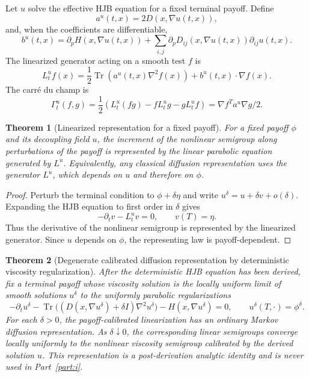 \documentclass[12pt, letterpaper]{amsart}
\providecommand{\Tr}{\operatorname{Tr}}
\theoremstyle{plain}
\newtheorem{theorem}{Theorem}[section]
\theoremstyle{definition}
\theoremstyle{remark}
\begin{document}
Let $u$ solve the effective HJB equation for a fixed terminal payoff.  Define
\begin{equation}
    a^u(t,x)=2D(x,\nabla u(t,x)),
\end{equation}
and, when the coefficients are differentiable,
\begin{equation}
    b^u(t,x)=\partial_pH(x,\nabla u(t,x))
    +\sum_{i,j}\partial_{p}D_{ij}(x,\nabla u(t,x))\partial_{ij}u(t,x).
\end{equation}
The linearized generator acting on a smooth test $f$ is
\begin{equation}
    L^u_tf(x)=\frac12\Tr(a^u(t,x)\nabla^2f(x))+b^u(t,x)\cdot\nabla f(x).
\end{equation}
The carr\'e du champ is
\begin{equation}
    \Gamma^u_t(f,g)=\frac12\left(L^u_t(fg)-fL^u_tg-gL^u_tf\right)
    =\nabla f^Ta^u\nabla g/2 .
\end{equation}

\begin{theorem}[Linearized representation for a fixed payoff]
\label{thm:linearized_representation}
For a fixed payoff $\phi$ and its decoupling field $u$, the increment of the nonlinear semigroup along perturbations of the payoff is represented by the linear parabolic equation generated by $L^u$.  Equivalently, any classical diffusion representation uses the generator $L^u$, which depends on $u$ and therefore on $\phi$.
\end{theorem}

\begin{proof}
Perturb the terminal condition to $\phi+\delta\eta$ and write $u^\delta=u+\delta v+o(\delta)$.  Expanding the HJB equation to first order in $\delta$ gives
\begin{equation}
    -\partial_tv-L^u_tv=0,
    \qquad v(T)=\eta .
\end{equation}
Thus the derivative of the nonlinear semigroup is represented by the linearized generator.  Since $u$ depends on $\phi$, the representing law is payoff-dependent.
\end{proof}


\begin{theorem}[Degenerate calibrated diffusion representation by deterministic viscosity regularization]
\label{thm:degenerate_calibrated_representation_regularization}
After the deterministic HJB equation has been derived, fix a terminal payoff
whose viscosity solution is the locally uniform limit of smooth solutions
\(u^\delta\) to the uniformly parabolic regularizations
\begin{equation}
    -\partial_t u^\delta
    -\Tr\big((D(x,\nabla u^\delta)+\delta I)\nabla^2u^\delta\big)
    -H(x,\nabla u^\delta)=0,
    \qquad u^\delta(T,\cdot)=\phi^\delta .
\end{equation}
For each \(\delta>0\), the payoff-calibrated linearization has an ordinary
Markov diffusion representation.  As \(\delta\downarrow0\), the corresponding
linear semigroups converge locally uniformly to the nonlinear viscosity
semigroup calibrated by the derived solution \(u\).  This representation is a
post-derivation analytic identity and is never used in Part~\ref{part:i}.
\end{theorem}
\end{document}
